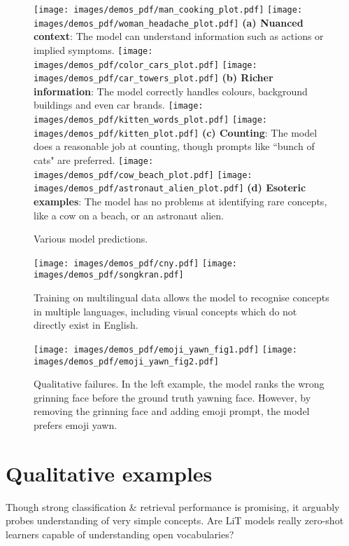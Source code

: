 \documentclass[10pt,twocolumn,letterpaper]{article}
\def \lit {LiT\xspace}
\begin{document}
\begin{figure*}[t]
    \small
    \centering
    \texttt{[image: images/demos\_pdf/man\_cooking\_plot.pdf]}
    \texttt{[image: images/demos\_pdf/woman\_headache\_plot.pdf]}
    \textbf{(a) Nuanced context}: The model can understand information such as actions or implied symptoms.
    \texttt{[image: images/demos\_pdf/color\_cars\_plot.pdf]}
    \texttt{[image: images/demos\_pdf/car\_towers\_plot.pdf]}
    \textbf{(b) Richer information}: The model correctly handles colours, background buildings and even car brands.
    \texttt{[image: images/demos\_pdf/kitten\_words\_plot.pdf]}
    \texttt{[image: images/demos\_pdf/kitten\_plot.pdf]}
    \textbf{(c) Counting}: The model does a reasonable job at counting, though prompts like “bunch of cats" are preferred.
    \texttt{[image: images/demos\_pdf/cow\_beach\_plot.pdf]}
    \texttt{[image: images/demos\_pdf/astronaut\_alien\_plot.pdf]}
    \textbf{(d) Esoteric examples}: The model has no problems at identifying rare concepts, like a cow on a beach, or an astronaut alien.
    \caption{Various model predictions.}
    \label{fig:success_examples}
\end{figure*}

\begin{figure*}[h]
    \small
    \centering
    \texttt{[image: images/demos\_pdf/cny.pdf]}
    \texttt{[image: images/demos\_pdf/songkran.pdf]}
    \caption{Training on multilingual data allows the model to recognise concepts in multiple languages, including visual concepts which do not directly exist in English.}
    \label{fig:xlang_examples}
\end{figure*}

\begin{figure*}[h]
    \small
    \centering
    \texttt{[image: images/demos\_pdf/emoji\_yawn\_fig1.pdf]}
    \texttt{[image: images/demos\_pdf/emoji\_yawn\_fig2.pdf]}
    \textbf{}
    \caption{Qualitative failures. In the left example, the model ranks the wrong grinning face before the ground truth yawning face. However, by removing the grinning face and adding emoji prompt, the model prefers emoji yawn.}
    \label{fig:failure_examples}
\end{figure*}

\section{Qualitative examples}
\label{appendix:demos}
Though strong classification \& retrieval performance is promising, it arguably probes understanding of very simple concepts. Are \lit{} models really zero-shot learners capable of understanding open vocabularies?
\end{document}
